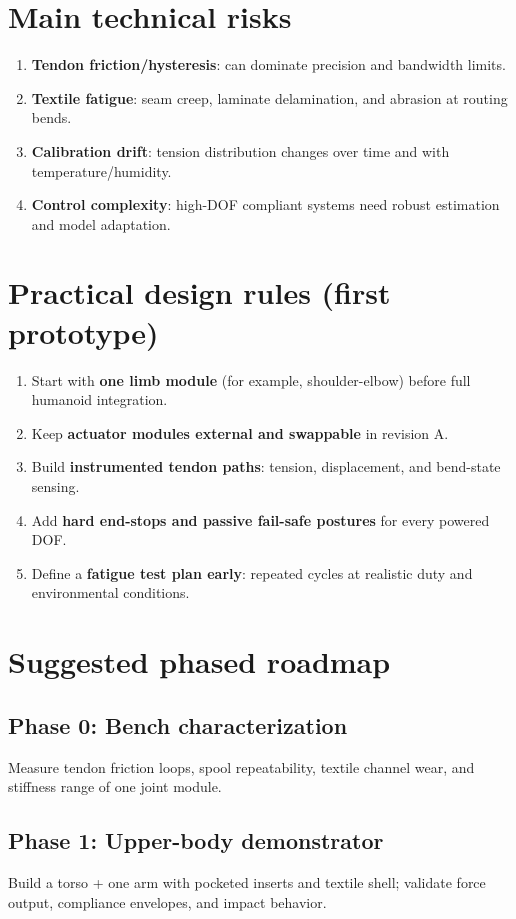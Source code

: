 \documentclass[11pt]{article}
\begin{document}
\section*{Main technical risks}
\begin{enumerate}[leftmargin=*]
  \item \textbf{Tendon friction/hysteresis}: can dominate precision and bandwidth limits.
  \item \textbf{Textile fatigue}: seam creep, laminate delamination, and abrasion at routing bends.
  \item \textbf{Calibration drift}: tension distribution changes over time and with temperature/humidity.
  \item \textbf{Control complexity}: high-DOF compliant systems need robust estimation and model adaptation.
\end{enumerate}

\section*{Practical design rules (first prototype)}
\begin{enumerate}[leftmargin=*]
  \item Start with \textbf{one limb module} (for example, shoulder-elbow) before full humanoid integration.
  \item Keep \textbf{actuator modules external and swappable} in revision A.
  \item Build \textbf{instrumented tendon paths}: tension, displacement, and bend-state sensing.
  \item Add \textbf{hard end-stops and passive fail-safe postures} for every powered DOF.
  \item Define a \textbf{fatigue test plan early}: repeated cycles at realistic duty and environmental conditions.
\end{enumerate}

\section*{Suggested phased roadmap}
\subsection*{Phase 0: Bench characterization}
Measure tendon friction loops, spool repeatability, textile channel wear, and stiffness range of one joint module.

\subsection*{Phase 1: Upper-body demonstrator}
Build a torso + one arm with pocketed inserts and textile shell; validate force output, compliance envelopes, and impact behavior.
\end{document}
